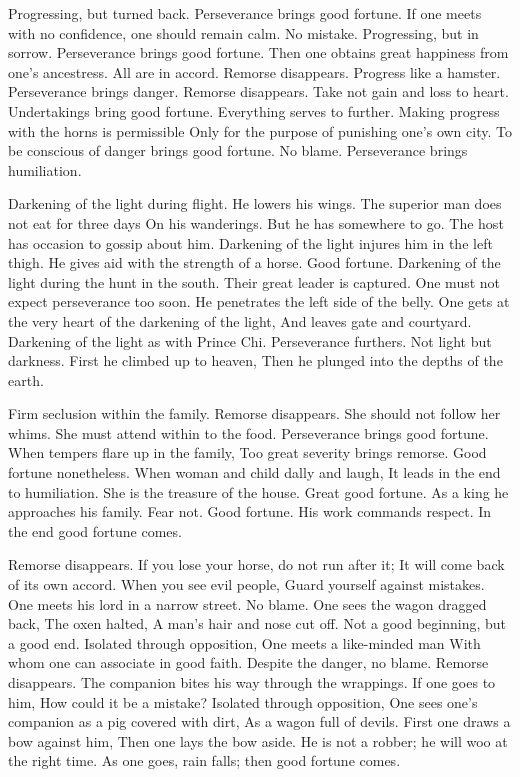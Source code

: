 {Progressing, but turned back.
 Perseverance brings good fortune.
 If one meets with no confidence, one should remain calm.
 No mistake.}
{Progressing, but in sorrow.
 Perseverance brings good fortune.
 Then one obtains great happiness from one’s ancestress.}
{All are in accord. Remorse disappears.}
{Progress like a hamster.
 Perseverance brings danger.}
{Remorse disappears.
 Take not gain and loss to heart.
 Undertakings bring good fortune.
 Everything serves to further.}
{Making progress with the horns is permissible
 Only for the purpose of punishing one’s own city.
 To be conscious of danger brings good fortune.
 No blame.
 Perseverance brings humiliation.}

{Darkening of the light during flight.
 He lowers his wings.
 The superior man does not eat for three days
 On his wanderings.
 But he has somewhere to go.
 The host has occasion to gossip about him.}
{Darkening of the light injures him in the left thigh.
 He gives aid with the strength of a horse.
 Good fortune.}
{Darkening of the light during the hunt in the south.
 Their great leader is captured.
 One must not expect perseverance too soon.}
{He penetrates the left side of the belly.
 One gets at the very heart of the darkening of the light,
 And leaves gate and courtyard.}
{Darkening of the light as with Prince Chi.
 Perseverance furthers.}
{Not light but darkness.
 First he climbed up to heaven,
 Then he plunged into the depths of the earth.}

{Firm seclusion within the family.
 Remorse disappears.}
{She should not follow her whims.
 She must attend within to the food.
 Perseverance brings good fortune.}
{When tempers flare up in the family,
 Too great severity brings remorse.
 Good fortune nonetheless.
 When woman and child dally and laugh,
 It leads in the end to humiliation.}
{She is the treasure of the house.
 Great good fortune.}
{As a king he approaches his family.
 Fear not.
 Good fortune.}
{His work commands respect.
 In the end good fortune comes.}

{Remorse disappears.
 If you lose your horse, do not run after it;
 It will come back of its own accord.
 When you see evil people,
 Guard yourself against mistakes.}
{One meets his lord in a narrow street.
 No blame.}
{One sees the wagon dragged back,
 The oxen halted,
 A man’s hair and nose cut off.
 Not a good beginning, but a good end.}
{Isolated through opposition,
 One meets a like-minded man
 With whom one can associate in good faith.
 Despite the danger, no blame.}
{Remorse disappears.
 The companion bites his way through the wrappings.
 If one goes to him,
 How could it be a mistake?
 Isolated through opposition,
 One sees one’s companion as a pig covered with dirt,
 As a wagon full of devils.
 First one draws a bow against him,
 Then one lays the bow aside.
 He is not a robber; he will woo at the right time.
 As one goes, rain falls; then good fortune comes.}
{}

